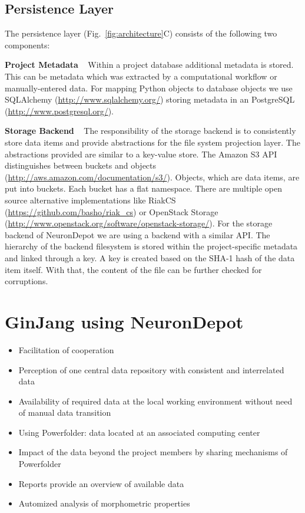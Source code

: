 \documentclass{frontiersSCNS} %
\begin{document}
\subsection{Persistence Layer}\label{sec:persistence_layer}

The persistence layer (Fig.~\ref{fig:architecture}C) consists of the following two components:

\textbf{Project Metadata} \texttt{  } Within a project database additional
metadata is stored. This can be metadata which was extracted by a computational
workflow or manually-entered data. For mapping Python objects to database
objects we use SQLAlchemy (\url{http://www.sqlalchemy.org/}) storing metadata
in an PostgreSQL (\url{http://www.postgresql.org/}).

\textbf{Storage Backend} \texttt{  } The responsibility of the storage backend
is to consistently store data items and provide abstractions for the file
system projection layer. The abstractions provided are similar to a key-value
store. The Amazon S3 API distinguishes between buckets and objects
(\url{http://aws.amazon.com/documentation/s3/}). Objects, which are data items,
are put into buckets. Each bucket has a flat namespace. There are multiple open
source alternative implementations like RiakCS
(\url{https://github.com/basho/riak\_cs}) or OpenStack Storage
(\url{http://www.openstack.org/software/openstack-storage/}). For the storage
backend of NeuronDepot we are using a backend with a similar API. The hierarchy
of the backend filesystem is stored within the project-specific metadata and
linked through a key. A key is created based on the SHA-1 hash of the data item
itself. With that, the content of the file can be further checked for
corruptions.

\section{GinJang using NeuronDepot}

\begin{itemize}
    \item Facilitation of cooperation
    \item Perception of one central data repository with consistent and
        interrelated data
    \item Availability of required data at the local working environment
        without need of manual data transition
    \item Using Powerfolder: data located at an associated computing center
    \item Impact of the data beyond the project members by sharing mechanisms
        of Powerfolder
    \item Reports provide an overview of available data
    \item Automized analysis of morphometric properties
\end{itemize}
\end{document}
